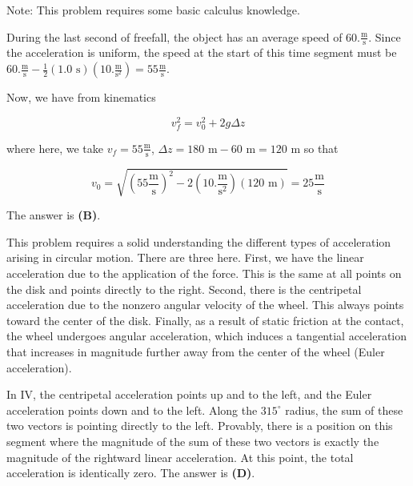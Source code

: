\documentclass[12pt]{article}
\begin{document}
Note: This problem requires some basic calculus knowledge.


\vspace{2 \baselineskip}



During the last second of freefall, the object has an average speed of $60. \frac{\text{m}}{\text{s}}$. Since the acceleration is uniform, the speed at the start of this time segment must be $60. \frac{\text{m}}{\text{s}} - \frac{1}{2} (1.0 \text{ s}) \left( 10. \frac{\text{m}}{\text{s}^2} \right) = 55 \frac{\text{m}}{\text{s}}$.

Now, we have from kinematics

$$v_f^2 = v_0^2 + 2 g \Delta z$$

where here, we take $v_f = 55 \frac{\text{m}}{\text{s}}$, $\Delta z = 180 \text{ m} - 60 \text{ m} = 120 \text{ m}$ so that

$$v_0 = \sqrt{\left( 55 \frac{\text{m}}{\text{s}} \right)^2 - 2 \left( 10. \frac{\text{m}}{\text{s}^2} \right) (120 \text{ m})} = 25 \frac{\text{m}}{\text{s}}$$

The answer is \textbf{(B)}.


\vspace{2 \baselineskip}



This problem requires a solid understanding the different types of acceleration arising in circular motion. There are three here. First, we have the linear acceleration due to the application of the force. This is the same at all points on the disk and points directly to the right. Second, there is the centripetal acceleration due to the nonzero angular velocity of the wheel. This always points toward the center of the disk. Finally, as a result of static friction at the contact, the wheel undergoes angular acceleration, which induces a tangential acceleration that increases in magnitude further away from the center of the wheel (Euler acceleration).

In IV, the centripetal acceleration points up and to the left, and the Euler acceleration points down and to the left. Along the $315^\circ$ radius, the sum of these two vectors is pointing directly to the left. Provably, there is a position on this segment where the magnitude of the sum of these two vectors is exactly the magnitude of the rightward linear acceleration. At this point, the total acceleration is identically zero. The answer is \textbf{(D)}.
\end{document}
